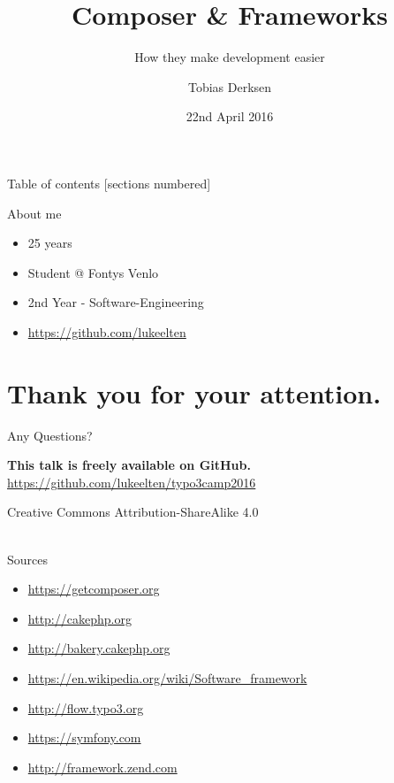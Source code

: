 \documentclass{beamer}
\title{Composer \& Frameworks}
\subtitle{How they make development easier}
\date{22nd April 2016}
\author{Tobias Derksen}
\institute{Fontys School of Technology \& Logistics}
\begin{document}
  \maketitle

  \begin{frame}{Table of contents}
    [sections numbered]
    \tableofcontents[hideallsubsections]
  \end{frame}


  \begin{frame}{About me}
  	\begin{itemize}
  		\item 25 years
  		\item Student @ Fontys Venlo
  		\item 2nd Year - Software-Engineering
  		\item \url{https://github.com/lukeelten}
  	\end{itemize}
  \end{frame}

  
  
  

	\section*{Thank you for your attention.}
	\begin{frame}[standout]
		Any Questions?
	\end{frame}
	
	\appendix
	
	\begin{frame}{}
		\textbf{This talk is freely available on GitHub.} \\
		\url{https://github.com/lukeelten/typo3camp2016}
		\vfill
		\begin{center}
			Creative Commons Attribution-ShareAlike 4.0 ~\\~\\
			\ccbysa
		\end{center}
	\end{frame}
	
	\begin{frame}{Sources}
		\begin{itemize}
			\item \url{https://getcomposer.org}
			\item \url{http://cakephp.org}
			\item \url{http://bakery.cakephp.org}
			\item \url{https://en.wikipedia.org/wiki/Software_framework}
			\item \url{http://flow.typo3.org}
			\item \url{https://symfony.com}
			\item \url{http://framework.zend.com}
		\end{itemize}
	\end{frame}
\end{document}

